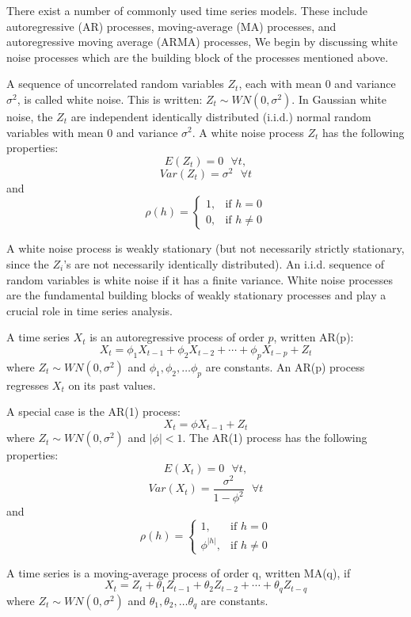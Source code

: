 There exist a number of commonly used time series models.
These include autoregressive (AR) processes, moving-average (MA) processes, and autoregressive moving average (ARMA) processes,
We begin by discussing white noise processes which are the building block of the processes mentioned above. 

A sequence of uncorrelated random variables $Z_t$, each with mean $0$ and variance $\sigma^2$, is called white noise.
This is written: $Z_t\sim WN(0,\sigma^2)$. 
In Gaussian white noise, the $Z_t$ are independent identically distributed (i.i.d.) normal random variables with mean 0 and variance $\sigma^2$.
A white noise process $Z_t$ has the following properties:
$$
E(Z_t) = 0  \,\,\,\, \forall t,
$$
$$
Var(Z_t) = \sigma^2  \,\,\,\, \forall t
$$
and
$$
\rho(h) =
\begin{cases}
    1,	            & \text{if } h = 0\\
    0,              & \text{if } h \ne 0
\end{cases}
$$

A white noise process is weakly stationary (but not necessarily strictly stationary, since the $Z_i$'s are not necessarily identically distributed). 
An i.i.d. sequence of random variables is white noise if it has a finite variance.  
White noise processes are the fundamental building blocks of weakly stationary processes and play a crucial role in time series analysis.

\bigskip
A time series $X_t$ is an autoregressive process of order $p$, written AR(p):
$$
X_t = \phi_1 X_{t-1} + \phi_2 X_{t-2} + \cdots + \phi_p X_{t-p} +Z_t
$$
where $Z_t \sim WN(0,\sigma^2)$ and $\phi_1, \phi_2, \ldots \phi_p$ are constants.
An AR(p) process regresses $X_t$ on its past values.

A special case is the AR(1) process: 
$$
X_t = \phi X_{t-1} + Z_t
$$
where $Z_t \sim WN(0,\sigma^2)$ and $|\phi|<1$.
The AR(1) process has the following properties:
$$
E(X_t) = 0  \,\,\,\, \forall t,
$$
$$
Var(X_t) = \frac{\sigma^2}{1-\phi^2}  \,\,\,\, \forall t
$$
and
$$
\rho(h) =
\begin{cases}
    1,	            & \text{if } h = 0\\
    \phi^{|h|},              & \text{if } h \ne 0
\end{cases}
$$

\bigskip
A time series is a moving-average process of order q, written MA(q), if 
$$
X_t = Z_t + \theta_1 Z_{t-1} + \theta_2 Z_{t-2} + \cdots + \theta_q Z_{t-q} 
$$
where $Z_t \sim WN(0,\sigma^2)$ and $\theta_1, \theta_2, \ldots \theta_q$ are constants.

